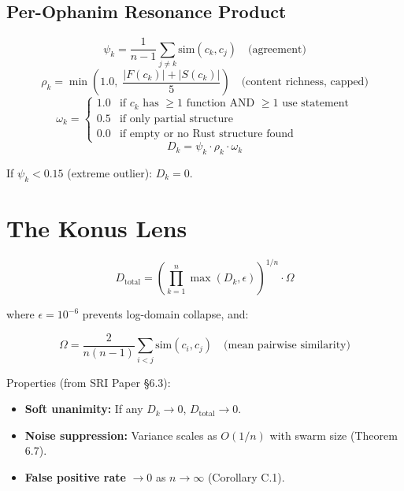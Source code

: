 \documentclass[11pt,a4paper]{article}
\begin{document}
\subsection{Per-Ophanim Resonance Product}

\begin{equation}
\psi_k = \frac{1}{n-1} \sum_{j \neq k} \text{sim}(c_k, c_j) \quad\text{(agreement)}
\end{equation}
\begin{equation}
\rho_k = \min\!\left(1.0,\;\frac{|F(c_k)| + |S(c_k)|}{5}\right) \quad\text{(content richness, capped)}
\end{equation}
\begin{equation}
\omega_k = \begin{cases} 
1.0 & \text{if } c_k \text{ has } \geq 1 \text{ function AND } \geq 1 \text{ use statement} \\ 
0.5 & \text{if only partial structure} \\ 
0.0 & \text{if empty or no Rust structure found}
\end{cases}
\end{equation}
\begin{equation}
D_k = \psi_k \cdot \rho_k \cdot \omega_k
\end{equation}

If $\psi_k < 0.15$ (extreme outlier): $D_k = 0$.


\section{The Konus Lens}
\label{sec:konus}

\begin{equation}
D_\text{total} = \left(\prod_{k=1}^{n} \max(D_k, \epsilon)\right)^{1/n} \cdot \Omega
\label{eq:dtotal}
\end{equation}

where $\epsilon = 10^{-6}$ prevents log-domain collapse, and:

\begin{equation}
\Omega = \frac{2}{n(n-1)} \sum_{i < j} \text{sim}(c_i, c_j)
\quad\text{(mean pairwise similarity)}
\end{equation}

Properties (from SRI Paper \S6.3):
\begin{itemize}[nosep]
\item \textbf{Soft unanimity:} If any $D_k \to 0$, 
      $D_\text{total} \to 0$.
\item \textbf{Noise suppression:} Variance scales as $O(1/n)$ 
      with swarm size (Theorem 6.7).
\item \textbf{False positive rate} $\to 0$ as $n \to \infty$ 
      (Corollary C.1).
\end{itemize}
\end{document}
